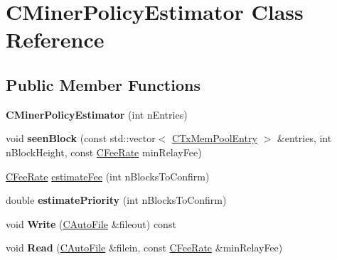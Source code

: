 \hypertarget{class_c_miner_policy_estimator}{}\section{C\+Miner\+Policy\+Estimator Class Reference}
\label{class_c_miner_policy_estimator}
\subsection*{Public Member Functions}
\begin{DoxyCompactItemize}
\item 
\mbox{\label{class_c_miner_policy_estimator_a13e8fe709d07a3e6b1bf31fbc128a998}} 
{\bfseries C\+Miner\+Policy\+Estimator} (int n\+Entries)
\item 
\mbox{\label{class_c_miner_policy_estimator_a2b30e1eaa7eec2744c576fba5bd1a168}} 
void {\bfseries seen\+Block} (const std\+::vector$<$ \mbox{\hyperlink{class_c_tx_mem_pool_entry}{C\+Tx\+Mem\+Pool\+Entry}} $>$ \&entries, int n\+Block\+Height, const \mbox{\hyperlink{class_c_fee_rate}{C\+Fee\+Rate}} min\+Relay\+Fee)
\item 
\mbox{\hyperlink{class_c_fee_rate}{C\+Fee\+Rate}} \mbox{\hyperlink{class_c_miner_policy_estimator_a00b6f58a508ee87999910972f37b3281}{estimate\+Fee}} (int n\+Blocks\+To\+Confirm)
\item 
\mbox{\label{class_c_miner_policy_estimator_ae9bb4813622680e6e3b48ea8c0ce41b6}} 
double {\bfseries estimate\+Priority} (int n\+Blocks\+To\+Confirm)
\item 
\mbox{\label{class_c_miner_policy_estimator_a431733d4c161afb6cef2c7a3f4fec99f}} 
void {\bfseries Write} (\mbox{\hyperlink{class_c_auto_file}{C\+Auto\+File}} \&fileout) const
\item 
\mbox{\label{class_c_miner_policy_estimator_a86e709bc44e9f6f597519173f15595ff}} 
void {\bfseries Read} (\mbox{\hyperlink{class_c_auto_file}{C\+Auto\+File}} \&filein, const \mbox{\hyperlink{class_c_fee_rate}{C\+Fee\+Rate}} \&min\+Relay\+Fee)
\end{DoxyCompactItemize}


